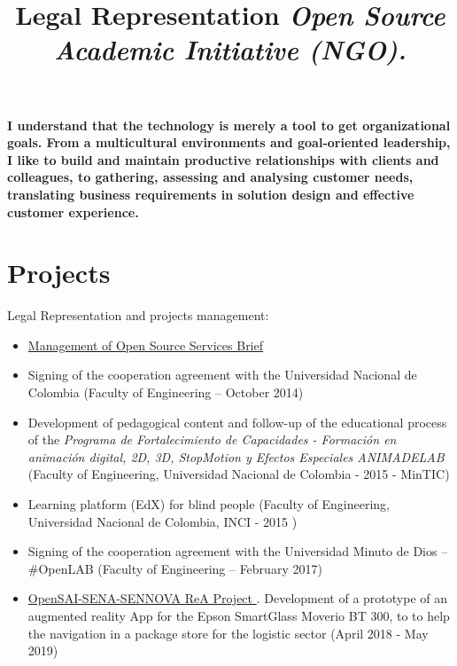 \documentclass[overlapped,line,final]{res}
\begin{document}
\begin{resume}
\begin{itemize}
\end{itemize}
    
	\textbf {I understand that the technology is merely a tool to get organizational goals. From a multicultural environments and goal-oriented leadership, I like to build and maintain productive relationships with clients and colleagues, to gathering, assessing and analysing customer needs, translating business requirements in solution design and effective customer experience.}

\vspace{0.5cm}
\section{\sc Projects } %
\vspace{0.5cm}
\title{\bf Legal Representation
	\newline \em Open Source Academic Initiative (NGO).
}
\begin{position}
Legal Representation and projects management:
	\begin{itemize}
		\item \href{https://opensai.org/business}{Management of Open Source Services Brief }
		\item Signing of the cooperation agreement with the Universidad Nacional de Colombia (Faculty of Engineering – October 2014)
		\item Development of pedagogical content and follow-up of the educational process of the \textit{Programa de Fortalecimiento de Capacidades - Formación en animación digital, 2D, 3D, StopMotion y Efectos Especiales ANIMADELAB} (Faculty of Engineering, Universidad Nacional de Colombia - 2015 - MinTIC)
		\item Learning platform (EdX) for blind people (Faculty of Engineering, Universidad Nacional de Colombia, INCI - 2015 )
		\item Signing of the cooperation agreement with the Universidad Minuto de Dios – \#OpenLAB (Faculty of Engineering – February 2017)
		\item \href{https://rea.opensai.org/}{OpenSAI-SENA-SENNOVA ReA Project }. Development of a prototype of an augmented reality App for the Epson SmartGlass Moverio BT 300, to to help the navigation in a package store for the logistic sector (April 2018 - May 2019)

\end{itemize}
\end{position}
\end{resume}
\end{document}
